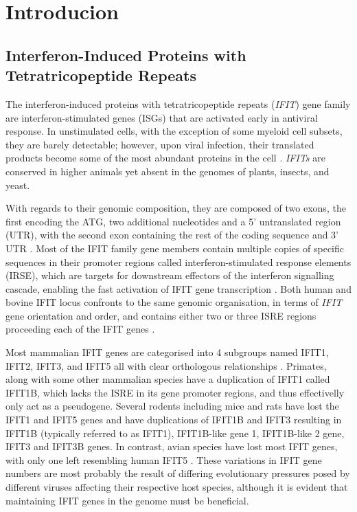 \chapter{Introducion} \label{ch:Introduction}
\section{Interferon-Induced Proteins with Tetratricopeptide Repeats} \label{sec:Interferon-Induced Proteins with Tetratricopeptide Repeats}
The interferon-induced proteins with tetratricopeptide repeats (\textit{IFIT}) gene family are interferon-stimulated genes (ISGs) that are activated early in antiviral response. In unstimulated cells, with the exception of some myeloid cell subsets, they are barely detectable; however, upon viral infection, their translated products become some of the most abundant proteins in the cell \cite{Diamond2013TheProteins}. \textit{IFITs} are conserved in higher animals yet absent in the genomes of plants, insects, and yeast. 

With regards to their genomic composition, they are composed of two exons, the first encoding the ATG, two additional nucleotides and a 5' untranslated region (UTR), with the second exon containing the rest of the coding sequence and 3' UTR \cite{deVeer1998IFI60/ISG60/IFIT4Genes}. Most of the IFIT family gene members contain multiple copies of specific sequences in their promoter regions called interferon-stimulated response elements (IRSE), which are targets for downstream effectors of the interferon signalling cascade, enabling the fast activation of IFIT gene transcription \cite{Lou2009IFR-9/STAT2STAT1}. Both human and bovine IFIT locus confronts to the same genomic organisation, in terms of \textit{IFIT} gene orientation and order, and contains either two or three ISRE regions proceeding each of the IFIT genes \cite{Liu2013Lineage-SpecificFamily}.

Most mammalian IFIT genes are categorised into 4 subgroups named IFIT1, IFIT2, IFIT3, and IFIT5 all with clear orthologous relationships \cite{Sarkar2004NovelGenes}. Primates, along with some other mammalian species have a duplication of IFIT1 called IFIT1B, which lacks the ISRE in its gene promoter regions, and thus effectivelly only act as a pseudogene. Several rodents including mice and rats have lost the IFIT1 and IFIT5 genes and have duplications of IFIT1B and IFIT3 \cite{Daugherty2016Evolution-guidedMammals.} resulting in IFIT1B (typically referred to as IFIT1), IFIT1B-like gene 1, IFIT1B-like 2 gene, IFIT3 and IFIT3B genes. In contrast, avian species have lost most IFIT genes, with only one left resembling human IFIT5 \cite{Liu2013Lineage-SpecificFamily}. These variations in IFIT gene numbers are most probably the result of differing evolutionary pressures posed by different viruses affecting their respective host species, although it is evident that maintaining IFIT genes in the genome must be beneficial. 

